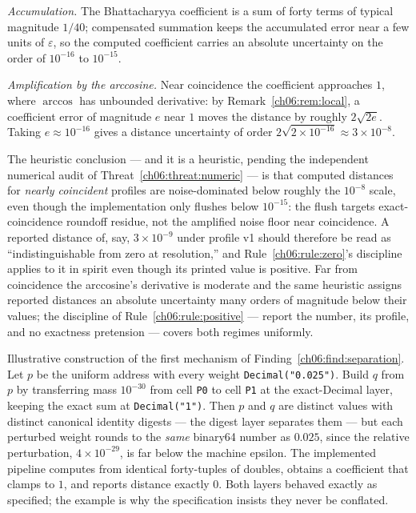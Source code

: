 \emph{Accumulation.} The Bhattacharyya coefficient is a sum of forty
terms of typical magnitude $1/40$; compensated summation keeps the
accumulated error near a few units of $\varepsilon$, so the computed
coefficient carries an absolute uncertainty on the order of
$10^{-16}$ to $10^{-15}$.

\emph{Amplification by the arccosine.} Near coincidence the coefficient
approaches $1$, where $\arccos$ has unbounded derivative: by
Remark~\ref{ch06:rem:local}, a coefficient error of magnitude $e$ near
$1$ moves the distance by roughly $2\sqrt{2e}$. Taking
$e \approx 10^{-16}$ gives a distance uncertainty of order
$2\sqrt{2 \times 10^{-16}} \approx 3 \times 10^{-8}$.

The heuristic conclusion --- and it is a heuristic, pending the
independent numerical audit of
Threat~\ref{ch06:threat:numeric} --- is that computed distances for
\emph{nearly coincident} profiles are noise-dominated below roughly the
$10^{-8}$ scale, even though the implementation only flushes below
$10^{-15}$: the flush targets exact-coincidence roundoff residue, not
the amplified noise floor near coincidence. A reported distance of,
say, $3 \times 10^{-9}$ under profile v1 should therefore be read as
``indistinguishable from zero at resolution,'' and
Rule~\ref{ch06:rule:zero}'s discipline applies to it in spirit even
though its printed value is positive. Far from coincidence the
arccosine's derivative is moderate and the same heuristic assigns
reported distances an absolute uncertainty many orders of magnitude
below their values; the discipline of
Rule~\ref{ch06:rule:positive} --- report the number, its profile, and
no exactness pretension --- covers both regimes uniformly.

\begin{example}\label{ch06:ex:collision}
Illustrative construction of the first mechanism of
Finding~\ref{ch06:find:separation}. Let $p$ be the uniform address with
every weight \texttt{Decimal("0.025")}. Build $q$ from $p$ by
transferring mass $10^{-30}$ from cell \texttt{P0} to cell \texttt{P1}
at the exact-Decimal layer, keeping the exact sum at
\texttt{Decimal("1")}. Then $p$ and $q$ are distinct values with
distinct canonical identity digests --- the digest layer separates them
--- but each perturbed weight rounds to the \emph{same} binary64 number
as $0.025$, since the relative perturbation, $4 \times 10^{-29}$, is
far below the machine epsilon. The implemented pipeline computes from
identical forty-tuples of doubles, obtains a coefficient that clamps to
$1$, and reports distance exactly $0$. Both layers behaved exactly as
specified; the example is why the specification insists they never be
conflated.
\end{example}

